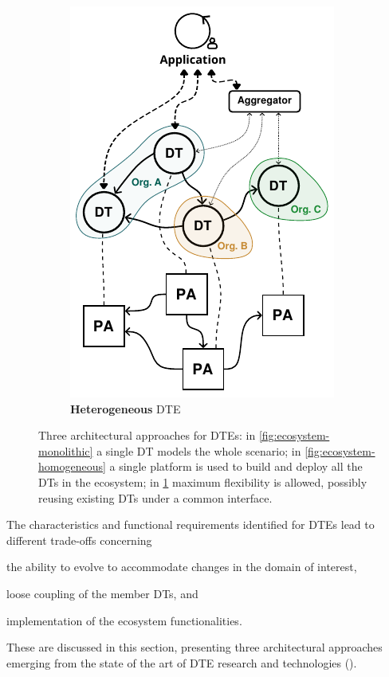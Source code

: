 \begin{figure}[t]
\begin{subfigure}[t]{0.32\textwidth}
        \includegraphics[width=\textwidth]{figures/hwodt/ecosystems_types-heterogeneous.pdf}
        \caption{\textbf{Heterogeneous} \ac{DTE}}
        \label{fig:ecosystem-heterogeneous}
    \end{subfigure}

    \caption{Three architectural approaches for \acp{DTE}: in \ref{fig:ecosystem-monolithic} a single \ac{DT} models the whole scenario; in \ref{fig:ecosystem-homogeneous} a single platform is used to build and deploy all the \acp{DT} in the ecosystem; in \ref{fig:ecosystem-heterogeneous} maximum flexibility is allowed, possibly reusing existing \acp{DT} under a common interface.}
    \label{fig:ecosystem-types}
\end{figure}


The characteristics and functional requirements identified for \acp{DTE} lead to different trade-offs concerning
\begin{inlinelist}
    \item the ability to evolve to accommodate changes in the domain of interest,
    \item loose coupling of the member \acp{DT}, 
    and
    \item implementation of the ecosystem functionalities.
\end{inlinelist}
%
These are discussed in this section, presenting three architectural approaches emerging from the state of the art of \ac{DTE} research and technologies ().

